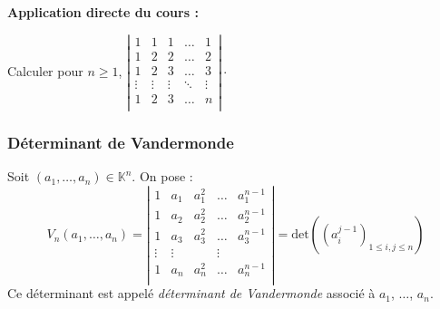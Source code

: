 \documentclass[french,11pt,twoside]{VcCours}
\newenvironment{ApplicationDirecte}{\textbf{Application directe du cours :}

}{}
\begin{document}
\begin{Exemple}

\vspace{9cm}
\end{Exemple}

\newpage
\begin{ApplicationDirecte} 
Calculer pour $n \geq 1$, $\left\vert \begin{array}{ccccc}
1 & 1 & 1 & \ldots & 1 \\
1 & 2 & 2 & \ldots & 2 \\
1 & 2 & 3 & \ldots & 3 \\
\vdots & \vdots & \vdots & \ddots & \vdots \\
1 & 2 & 3 & \ldots & n \\
\end{array} \right\vert \cdot$
\end{ApplicationDirecte}

\subsubsection{Déterminant de Vandermonde}

\begin{Definition}{} Soit $(a_1, \ldots, a_n) \in \mathbb{K}^n$. On pose :
$$ V_n(a_1, \ldots, a_n) = \left\vert \begin{array}{ccccc}
1 & a_1 & a_1^2 & \ldots & a_1^{n-1} \\
1 & a_2 & a_2^2 & \ldots & a_2^{n-1} \\
1 & a_3 & a_3^2 & \ldots & a_3^{n-1} \\
\vdots & \vdots & & \vdots \\
1 & a_n & a_n^2 & \ldots & a_n^{n-1} \\
\end{array}\right\vert = \textrm{det}( (a_i^{j-1})_{1 \leq i,j \leq n})$$
Ce déterminant est appelé \emph{déterminant de Vandermonde} associé à $a_1$, $\ldots$, $a_n$.
\end{Definition}
\end{document}
